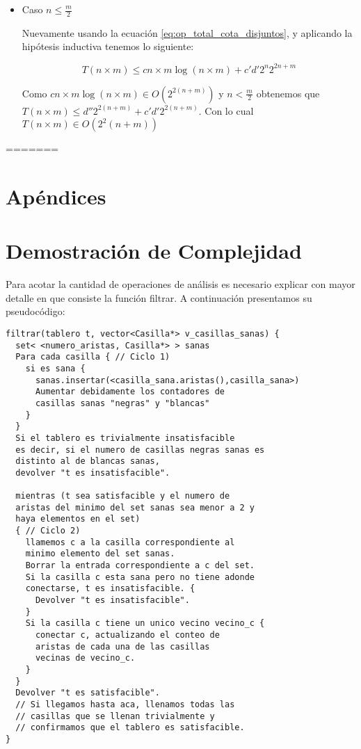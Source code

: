 \documentclass[a4paper, 12pt] {article}
\begin{document}
\begin{itemize}
\item Caso $n \leq \frac{m}{2}$

Nuevamente usando la ecuaci\'on \ref{eq:op_total_cota_disjuntos}, y aplicando la hip\'otesis inductiva tenemos lo siguiente: 

\begin{equation}
T\left( n \times m \right) \leq c n\times m \log \left(n\times m \right) + c'd' 2^{n}2^{2n+m}
\end{equation}


Como $ c n\times m \log \left(n\times m \right) \in O\left( 2^{2\left( n+m\right)}\right)$ y $ n < \frac{m}{2} $ obtenemos que $ T\left( n \times m \right) \leq d''2^{ 2\left( n+m \right)} + c'd' 2^{2\left(n+m \right)}$. Con lo cual $ T\left(n \times m \right) \in O\left(2^2\left( n+m\right) \right)$ 


\end{itemize}

=======

\section*{Ap\'endices} 
\section{Demostraci\'on de Complejidad}\label{demo:comp_3}

Para acotar la cantidad de operaciones de an\'alisis es necesario explicar con mayor detalle en que consiste la funci\'on filtrar.
A continuaci\'on presentamos su pseudoc\'odigo:

\begin{verbatim}
filtrar(tablero t, vector<Casilla*> v_casillas_sanas) {
  set< <numero_aristas, Casilla*> > sanas
  Para cada casilla { // Ciclo 1)
    si es sana {
      sanas.insertar(<casilla_sana.aristas(),casilla_sana>)
      Aumentar debidamente los contadores de 
      casillas sanas "negras" y "blancas"
    }
  }
  Si el tablero es trivialmente insatisfacible 
  es decir, si el numero de casillas negras sanas es 
  distinto al de blancas sanas,
  devolver "t es insatisfacible".
  
  mientras (t sea satisfacible y el numero de 
  aristas del minimo del set sanas sea menor a 2 y
  haya elementos en el set)
  { // Ciclo 2)
    llamemos c a la casilla correspondiente al
    minimo elemento del set sanas.
    Borrar la entrada correspondiente a c del set.
    Si la casilla c esta sana pero no tiene adonde 
    conectarse, t es insatisfacible. {
      Devolver "t es insatisfacible".
    }
    Si la casilla c tiene un unico vecino vecino_c {
      conectar c, actualizando el conteo de
      aristas de cada una de las casillas 
      vecinas de vecino_c.
    }
  }
  Devolver "t es satisfacible".
  // Si llegamos hasta aca, llenamos todas las
  // casillas que se llenan trivialmente y 
  // confirmamos que el tablero es satisfacible.
}

\end{verbatim}
\end{document}
